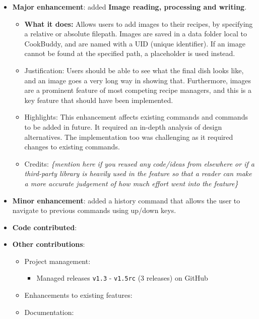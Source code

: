 \documentclass[11pt,british]{article}
\begin{document}
\begin{itemize}
    \item
    \textbf{Major enhancement}: added \textbf{Image reading, processing and writing}.
    \begin{itemize}
        \item \textbf{What it does:} Allows users to add images to their recipes, by specifying a relative or absolute
        filepath. Images are saved in a data folder local to CookBuddy, and are named with a
        UID (unique identifier). If an image cannot be found at the specified path, a placeholder is used instead.
        \item
        Justification: Users should be able to see what the final dish looks
        like, and an image goes a very long way in showing that. Furthermore, images are a prominent feature of most
        competing recipe managers, and this is a key feature that should have been implemented.
        \item
        Highlights: This enhancement affects existing commands and commands
        to be added in future. It required an in-depth analysis of design
        alternatives. The implementation too was challenging as it required
        changes to existing commands.
        \item
        Credits: \emph{\{mention here if you reused any code/ideas from
            elsewhere or if a third-party library is heavily used in the feature
            so that a reader can make a more accurate judgement of how much
            effort went into the feature\}}
    \end{itemize}
    \item
    \textbf{Minor enhancement}: added a history command that allows the
    user to navigate to previous commands using up/down keys.
    \item
    \textbf{Code contributed}:
    \item
    \textbf{Other contributions}:
    \begin{itemize}
        \item
        Project management:

        \begin{itemize}
            \item
            Managed releases \texttt{v1.3} - \texttt{v1.5rc} (3 releases) on
            GitHub
        \end{itemize}
        \item
        Enhancements to existing features:
        \item
        Documentation:


\end{itemize}
\end{itemize}
\end{document}
